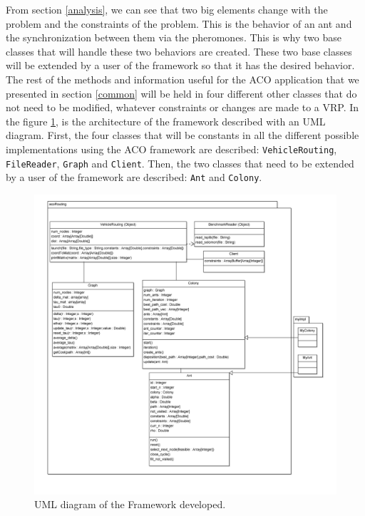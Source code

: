 From section \ref{analysis}, we can see that two big elements change with the problem and the constraints of the problem. This is the behavior of an ant and the synchronization between them via the pheromones. This is why two base classes that will handle these two behaviors are created. These two base classes will be extended by a user of the framework so that it has the desired behavior. 
The rest of the methods and information useful for the ACO application that we presented in section \ref{common} will be held in four different other classes that do not need to be modified, whatever constraints or changes are made to a VRP. In the figure \ref{fig:UML}, is the architecture of the framework described with an UML diagram. First, the four classes that will be constants in all the different possible implementations using the ACO framework are described: \texttt{VehicleRouting}, \texttt{FileReader}, \texttt{Graph} and \texttt{Client}. Then, the two classes that need to be extended by a user of the framework are described: \texttt{Ant} and \texttt{Colony}.
\begin{figure}
	\centering
		\includegraphics[scale = 0.1]{images/uml.png}
	\caption{UML diagram of the Framework developed.}
	\label{fig:UML}
\end{figure}

